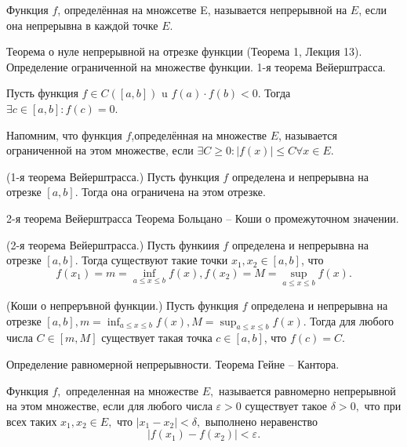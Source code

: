 \begin{definition}
    Функция $f$, определённая на множсетве E, называется непрерывной на $E$, если она непрерывна в каждой точке $E$.
\end{definition}

\newpage
\begin{problem}
Теорема о нуле непрерывной на отрезке функции (Теорема 1, Лекция 13). Определение
ограниченной на множестве функции. 1-я теорема Вейерштрасса.
\end{problem}
\begin{theorem}
    Пусть функция $f \in C([a, b])$ u $f(a) \cdot f(b)<0$. Тогда $\exists c \in[a, b]: f(c)=0$.

    Напомним, что функция $f$,определённая на множестве $E$, называется ограниченной на этом множестве, если $\exists C \geq 0:|f(x)| \leq C \forall x \in E$.
\end{theorem}

\begin{theorem}
    (1-я теорема Вейерштрасса.) Пусть функция $f$ определена и непрерывна на отрезке $[a, b]$. Тогда она ограничена на этом отрезке.
\end{theorem}

\newpage
\begin{problem}
2-я теорема Вейерштрасса Теорема Больцано – Коши о промежуточном значении.
\end{problem}
\begin{theorem}
    (2-я теорема Вейерштрасса.) Пусть функиия $f$ определена и непрерывна на отрезке $[a, b]$. Тогда существуют такие точки $x_1, x_2 \in[a, b]$, что
    $$
        f\left(x_1\right)=m=\inf _{a \leq x \leq b} f(x), f\left(x_2\right)=M=\sup _{a \leq x \leq b} f(x) .
    $$
\end{theorem}

\begin{theorem}
    (Коши о непреръвной функции.) Пусть функция $f$ определена и непрерывна на отрезке $[a, b], m=\inf _{a \leq x \leq b} f(x), M=\sup _{a \leq x \leq b} f(x)$. Тогда для любого числа $C \in[m, M]$ существует такая точка $c \in[a, b]$, что $f(c)=C$.
\end{theorem}

\newpage
\begin{problem}
Определение равномерной непрерывности. Теорема Гейне – Кантора.
\end{problem}

\begin{definition}
    Функция $f,$ определенная на множестве $E,$
    называется равномерно непрерывной на этом множестве,
    если для любого числа $\varepsilon>0$ существует
    такое $\delta>0,$ что при всех таких
    $x_1, x_2\in E,$ что $|x_1-x_2|<\delta,$ выполнено
    неравенство
    $$
        |f(x_1)-f(x_2)|<\varepsilon.
    $$
\end{definition}

